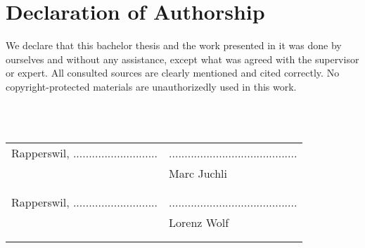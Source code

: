 \chapter{Declaration of Authorship}
We declare that this bachelor thesis and the work presented in it was done by
ourselves and without any assistance, except what was agreed with the
supervisor or expert. All consulted sources are clearly mentioned and cited correctly. No
copyright-protected materials are unauthorizedly used in this work.

\hfill \\
\hfill \\

\begin{tabular}[l]{p{7cm} p{7cm}}
   Rapperswil, ...........................
   & ......................................... \\
   & Marc Juchli \\
   &\\ & \\
   Rapperswil, ...........................
   & ......................................... \\
   & Lorenz Wolf \\
   &\\ & \\
\end{tabular}


